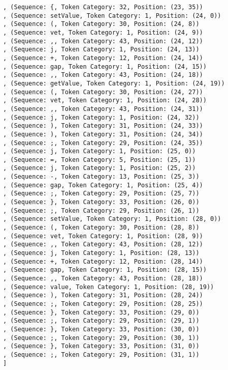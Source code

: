 \documentclass[a4paper, 12pt, article]{memoir}
\begin{document}
\begin{lstlisting}
, (Sequence: {, Token Category: 32, Position: (23, 35))
, (Sequence: setValue, Token Category: 1, Position: (24, 0))
, (Sequence: (, Token Category: 30, Position: (24, 8))
, (Sequence: vet, Token Category: 1, Position: (24, 9))
, (Sequence: ,, Token Category: 43, Position: (24, 12))
, (Sequence: j, Token Category: 1, Position: (24, 13))
, (Sequence: +, Token Category: 12, Position: (24, 14))
, (Sequence: gap, Token Category: 1, Position: (24, 15))
, (Sequence: ,, Token Category: 43, Position: (24, 18))
, (Sequence: getValue, Token Category: 1, Position: (24, 19))
, (Sequence: (, Token Category: 30, Position: (24, 27))
, (Sequence: vet, Token Category: 1, Position: (24, 28))
, (Sequence: ,, Token Category: 43, Position: (24, 31))
, (Sequence: j, Token Category: 1, Position: (24, 32))
, (Sequence: ), Token Category: 31, Position: (24, 33))
, (Sequence: ), Token Category: 31, Position: (24, 34))
, (Sequence: ;, Token Category: 29, Position: (24, 35))
, (Sequence: j, Token Category: 1, Position: (25, 0))
, (Sequence: =, Token Category: 5, Position: (25, 1))
, (Sequence: j, Token Category: 1, Position: (25, 2))
, (Sequence: -, Token Category: 13, Position: (25, 3))
, (Sequence: gap, Token Category: 1, Position: (25, 4))
, (Sequence: ;, Token Category: 29, Position: (25, 7))
, (Sequence: }, Token Category: 33, Position: (26, 0))
, (Sequence: ;, Token Category: 29, Position: (26, 1))
, (Sequence: setValue, Token Category: 1, Position: (28, 0))
, (Sequence: (, Token Category: 30, Position: (28, 8))
, (Sequence: vet, Token Category: 1, Position: (28, 9))
, (Sequence: ,, Token Category: 43, Position: (28, 12))
, (Sequence: j, Token Category: 1, Position: (28, 13))
, (Sequence: +, Token Category: 12, Position: (28, 14))
, (Sequence: gap, Token Category: 1, Position: (28, 15))
, (Sequence: ,, Token Category: 43, Position: (28, 18))
, (Sequence: value, Token Category: 1, Position: (28, 19))
, (Sequence: ), Token Category: 31, Position: (28, 24))
, (Sequence: ;, Token Category: 29, Position: (28, 25))
, (Sequence: }, Token Category: 33, Position: (29, 0))
, (Sequence: ;, Token Category: 29, Position: (29, 1))
, (Sequence: }, Token Category: 33, Position: (30, 0))
, (Sequence: ;, Token Category: 29, Position: (30, 1))
, (Sequence: }, Token Category: 33, Position: (31, 0))
, (Sequence: ;, Token Category: 29, Position: (31, 1))
]
\end{lstlisting}
\end{document}

